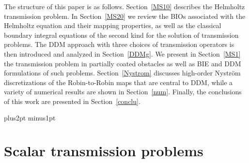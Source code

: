 \documentclass[11pt]{article}
\numberwithin{equation}{section}
\begin{document}
The structure of this paper is as follows. Section~\ref{MS10} describes the Helmholtz transmission problem. In Section~\ref{MS20} we review the BIOs associated with the Helmholtz equation and their mapping properties, as well as the classical boundary integral equations of the second kind for the solution of transmission problems. The DDM approach with three choices of transmission operators is then introduced and analyzed in Section~\ref{DDMg}. We present in Section~\ref{MS1} the transmission problem in partially coated obstacles as well as BIE and DDM formulations of such problems. Section~\ref{Nystrom} discusses high-order Nystr\"om discretizations of the Robin-to-Robin maps that are central to DDM, while a variety of numerical results are shown in Section~\ref{num}. Finally,  the conclusions of this work are presented in Section~\ref{conclu}.



\parskip 2pt plus2pt minus1pt

\section{Scalar transmission problems \label{MS10}}
\end{document}
